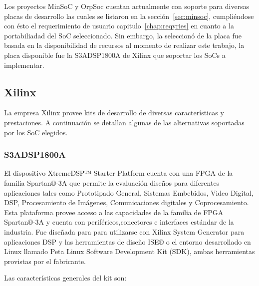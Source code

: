 				Los proyectos MinSoC y OrpSoc cuentan actualmente con soporte para diversas placas de desarrollo las cuales se listaron en la sección~\ref{sec:minsoc}, cumpliéndose con ésto el requerimiento de usuario capitulo~\ref{chap:reqyries} en cuanto a la portabiliadad del SoC seleccionado. Sin embargo, la seleccionó de la placa fue basada en la disponibilidad de recursos al momento de realizar este trabajo, la placa disponible fue la S3ADSP1800A de Xilinx que soportar los SoCs a implementar. 

				\subsection{Xilinx}
				La empresa Xilinx provee kits de desarrollo de diversas características y prestaciones. A continuación se detallan algunas de las alternativas soportadas por los SoC elegidos.
				\subsubsection{S3ADSP1800A}
				El dispositivo XtremeDSP™ Starter Platform cuenta con una FPGA de la familia Spartan®-3A que permite la evaluación diseños para diferentes
				aplicaciones tales como Prototipado General, Sistemas Embebidos, Video Digital, DSP, Procesamiento de Imágenes, Comunicaciones digitales y
				Coprocesamiento. Esta plataforma provee acceso a las capacidades de la familia de FPGA Spartan®-3A y cuenta con periféricos,conectores e
				interfaces estándar de la industria. Fue diseñada para para utilizarse con Xilinx System Generator para aplicaciones DSP y las herramientas de
				diseño ISE® o el entorno desarrollado en Linux llamado Peta Linux Software Development Kit (SDK), ambas herramientas provistas por el fabricante. 
				
				Las características generales del kit son:
			
